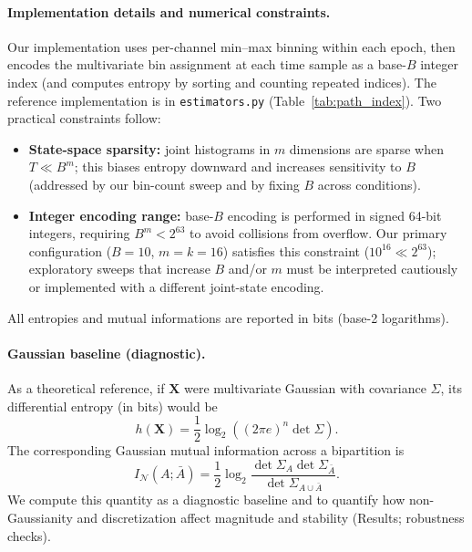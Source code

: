 \documentclass[11pt]{article}
\begin{document}
\paragraph{Implementation details and numerical constraints.}
Our implementation uses per-channel min--max binning within each epoch, then encodes the multivariate bin assignment at each time sample as a base-$B$ integer index (and computes entropy by sorting and counting repeated indices). The reference implementation is in \texttt{estimators.py} (Table~\ref{tab:path_index}). Two practical constraints follow:
\begin{itemize}[leftmargin=*]
    \item \textbf{State-space sparsity:} joint histograms in $m$ dimensions are sparse when $T \ll B^m$; this biases entropy downward and increases sensitivity to $B$ (addressed by our bin-count sweep and by fixing $B$ across conditions).
    \item \textbf{Integer encoding range:} base-$B$ encoding is performed in signed 64-bit integers, requiring $B^{m} < 2^{63}$ to avoid collisions from overflow. Our primary configuration ($B=10$, $m=k=16$) satisfies this constraint ($10^{16} \ll 2^{63}$); exploratory sweeps that increase $B$ and/or $m$ must be interpreted cautiously or implemented with a different joint-state encoding.
\end{itemize}
All entropies and mutual informations are reported in bits (base-2 logarithms).

\paragraph{Gaussian baseline (diagnostic).}
As a theoretical reference, if $\mathbf{X}$ were multivariate Gaussian with covariance $\Sigma$, its differential entropy (in bits) would be
\begin{equation}
h(\mathbf{X}) = \frac{1}{2}\log_{2}\left((2\pi e)^{n}\det \Sigma\right).
\label{eq:gaussian_entropy}
\end{equation}
The corresponding Gaussian mutual information across a bipartition is
\begin{equation}
I_{\mathcal{N}}(A;\bar{A}) = \frac{1}{2}\log_{2}\frac{\det \Sigma_A \det \Sigma_{\bar{A}}}{\det \Sigma_{A\cup \bar{A}}}.
\label{eq:gaussian_mi}
\end{equation}
We compute this quantity as a diagnostic baseline and to quantify how non-Gaussianity and discretization affect magnitude and stability (Results; robustness checks).
\end{document}
